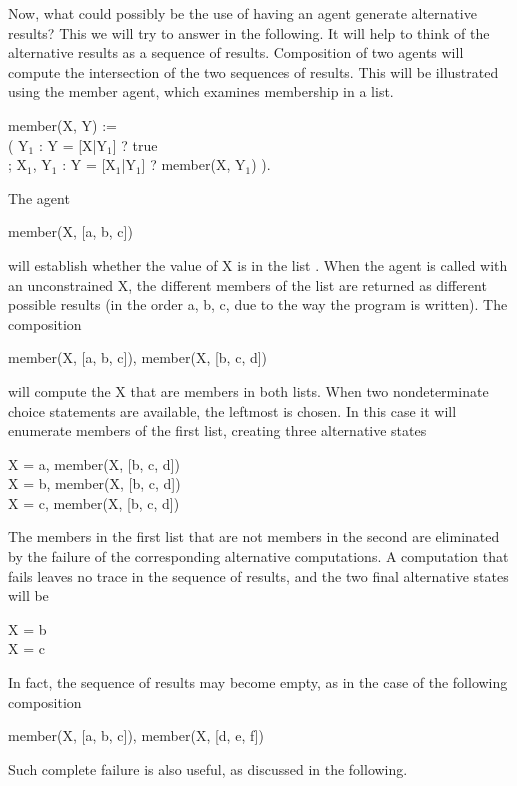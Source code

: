 Now, what could possibly be the use of having an agent generate
alternative results? This we will try to answer in the following.  It
will help to think of the alternative results as a sequence of
results.  Composition of two agents will compute the intersection of
the two sequences of results.  This will be illustrated using the
member agent, which examines membership in a list.
%
\begin{program}
member(X, Y) := \\
\>\>( Y$_1$ : Y = [X|Y$_1$] ? true \\
\>\>; X$_1$, Y$_1$ : Y = [X$_1$|Y$_1$] ? member(X, Y$_1$) ).
\end{program}%
%
The agent
%
\begin{progex}
member(X, [a, b, c])
\end{progex}%
%
will establish whether the value of {\prog X} is in the list {\prog
[a, b, c]}.  When the agent is called with an unconstrained {\prog X},
the different members of the list are returned as different possible
results (in the order {\prog a, b, c}, due to the way the program is
written).  The composition
%
\begin{progex}
member(X, [a, b, c]), member(X, [b, c, d])
\end{progex}%
%
will compute the {\prog X} that are members in both lists.  When two
nondeterminate choice statements are available, the leftmost is
chosen.  In this case it will enumerate members of the first list,
creating three alternative states
%
\begin{progex}
X = a, member(X, [b, c, d]) \\
X = b, member(X, [b, c, d]) \\
X = c, member(X, [b, c, d])
\end{progex}%
%
The members in the first list that are not members in the second are
eliminated by the failure of the corresponding alternative
computations.  A computation that fails leaves no trace in the sequence
of results, and the two final alternative states will be
%
\begin{progex}
X = b \\
X = c 
\end{progex}%
%
In fact, the sequence of results may become empty, as in the case of
the following composition
%
\begin{progex}
member(X, [a, b, c]), member(X, [d, e, f])
\end{progex}%
%
Such complete failure is also useful, as discussed in the following.

